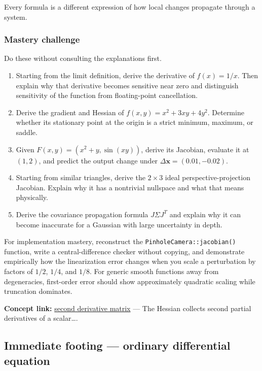 Every formula is a different expression of how local changes propagate through a system.

\subsubsection{Mastery challenge}\label{02-foundations-ii-ch021-mastery-challenge}

\hypertarget{02-foundations-ii-ch021-mastery-challenge}{}

Do these without consulting the explanations first.

\begin{enumerate}
\def\labelenumi{\arabic{enumi}.}
\tightlist
\item
  Starting from the limit definition, derive the derivative of \(f(x)=1/x\). Then explain why that derivative becomes sensitive near zero and distinguish sensitivity of the function from floating-point cancellation.
\item
  Derive the gradient and Hessian of \(f(x,y)=x^2+3xy+4y^2\). Determine whether its stationary point at the origin is a strict minimum, maximum, or saddle.
\item
  Given \(F(x,y)=(x^2+y,\sin(xy))\), derive its Jacobian, evaluate it at \((1,2)\), and predict the output change under \(\Delta\mathbf x=(0.01,-0.02)\).
\item
  Starting from similar triangles, derive the \(2\times3\) ideal perspective-projection Jacobian. Explain why it has a nontrivial nullspace and what that means physically.
\item
  Derive the covariance propagation formula \(J\Sigma J^T\) and explain why it can become inaccurate for a Gaussian with large uncertainty in depth.
\end{enumerate}

For implementation mastery, reconstruct the \texttt{PinholeCamera::jacobian()} function, write a central-difference checker without copying, and demonstrate empirically how the linearization error changes when you scale a perturbation by factors of \(1/2\), \(1/4\), and \(1/8\). For generic smooth functions away from degeneracies, first-order error should show approximately quadratic scaling while truncation dominates.

\textbf{Concept link:} \hyperref[02-foundations-ii-ch021-jacobians-curvature-and-local-approximation]{second derivative matrix} --- The Hessian collects second partial derivatives of a scalar\ldots.

\subsection{Immediate footing --- ordinary differential equation}\label{02-foundations-ii-ch021-immediate-footing-ordinary-differential-equation}

